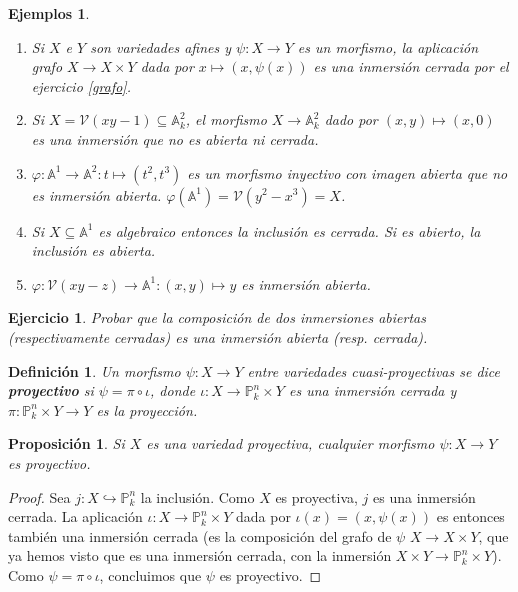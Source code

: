 \documentclass[a4paper,10pt]{book}
\newtheorem{prop}[thm]{Proposición}
\newtheorem{defn}[thm]{Definición}
\newtheorem{eje}[thm]{Ejemplos}
\newtheorem{ejercicio}{Ejercicio}[chapter]
\newcommand{\AAA}{\mathbb A}
\newcommand{\PP}{\mathbb P}
\newcommand{\Pnk}{\PP^n_k}
\newcommand{\VV}{{\mathcal V}}
\begin{document}
\begin{eje}
 \begin{enumerate}
  \item Si $X$ e $Y$ son variedades afines y $\psi:X\to Y$ es un morfismo, la aplicación grafo $X\to X\times Y$ dada por $x\mapsto (x,\psi(x))$ es una inmersión cerrada por el ejercicio \ref{grafo}.
  \item Si $X=\VV(xy-1)\subseteq\AAA^2_k$, el morfismo $X\to\AAA^2_k$ dado por $(x,y)\mapsto (x,0)$ es una inmersión que no es abierta ni cerrada. 
  \item $\varphi:\mathbb{A}^1\to\mathbb{A}^2:t\mapsto(t^2,t^3)$ es un morfismo inyectivo con imagen abierta que no es inmersión abierta. $\varphi(\mathbb{A}^1)=\VV(y^2-x^3)=X$. 
  \item Si $X\subseteq\mathbb{A}^1$ es algebraico entonces la inclusión es cerrada. Si es abierto, la inclusión es abierta.
  \item $\varphi:\VV(xy-z)\to\mathbb{A}^1:(x,y)\mapsto y$ es inmersión abierta.
 \end{enumerate}
\end{eje}


\begin{ejercicio}
 Probar que la composición de dos inmersiones abiertas (respectivamente cerradas) es una inmersión abierta (resp. cerrada).
\end{ejercicio}

\begin{defn}
 Un morfismo $\psi:X\to Y$ entre variedades cuasi-proyectivas se dice {\bf proyectivo} si $\psi=\pi\circ\iota$, donde $\iota:X\to \Pnk\times Y$ es una inmersión cerrada y $\pi:\Pnk\times Y\to Y$ es la proyección.
\end{defn}

\begin{prop}
 Si $X$ es una variedad proyectiva, cualquier morfismo $\psi:X\to Y$ es proyectivo.
\end{prop}

\begin{proof}
 Sea $j:X\hookrightarrow\Pnk$ la inclusión. Como $X$ es proyectiva, $j$ es una inmersión cerrada. La aplicación $\iota:X\to \Pnk\times Y$ dada por $\iota(x)=(x,\psi(x))$ es entonces también una inmersión cerrada (es  la composición del grafo de $\psi$ $X\to X\times Y$, que ya hemos visto que es una inmersión cerrada, con la inmersión $X\times Y\to\Pnk\times Y$). Como $\psi=\pi\circ\iota$, concluimos que $\psi$ es proyectivo. 
\end{proof}
\end{document}
